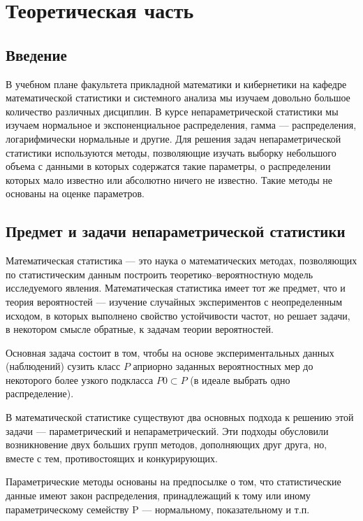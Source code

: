 \documentclass[14pt,a4paper]{scrartcl}
\begin{document}
    \newpage
    \tableofcontents

    \newpage
    \section{Теоретическая часть}
    \subsection{Введение}
    В учебном плане факультета прикладной математики и кибернетики на кафедре математической статистики и системного анализа мы изучаем довольно большое количество различных дисциплин. В курсе непараметрической статистики мы изучаем нормальное и экспоненциальное распределения, гамма --- распределения, логарифмически нормальные и другие. Для решения задач непараметрической статистики используются методы, позволяющие изучать выборку небольшого объема с данными в которых содержатся такие параметры, о распределении которых мало известно или абсолютно ничего не известно. Такие методы не основаны на оценке параметров.

    \subsection{Предмет и задачи непараметрической статистики}
    Математическая статистика --- это наука о математических методах, позволяющих по статистическим данным построить теоретико–вероятностную модель исследуемого явления. Математическая статистика имеет тот же предмет, что и теория  вероятностей --- изучение случайных экспериментов с неопределенным исходом, в которых выполнено свойство устойчивости частот, но решает задачи, в некотором  смысле обратные, к задачам теории вероятностей.

    Основная задача состоит в том, чтобы на основе экспериментальных данных (наблюдений) сузить класс $P$ априорно заданных вероятностных мер до некоторого более узкого подкласса $P0 \subset P$ (в идеале выбрать одно распределение).

    В математической статистике существуют два основных подхода к решению этой задачи ---  параметрический и непараметрический. Эти подходы обусловили возникновение двух больших групп методов, дополняющих друг друга, но, вместе с тем, противостоящих и конкурирующих.

    Параметрические методы основаны на предпосылке о том, что статистические данные имеют закон распределения, принадлежащий к тому или иному параметрическому семейству P --- нормальному, показательному и т.п.
\end{document}
